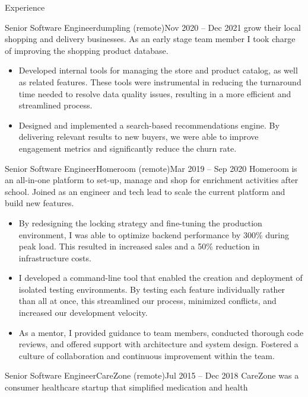 \documentclass[colibri]{mcdowellcv}
\begin{document}
\begin{cvsection}{Experience}
\begin{cvsubsection}{Senior Software Engineer}{dumpling (remote)}{Nov 2020 -- Dec 2021}
    grow their local shopping and delivery businesses. As an early stage team
    member I took charge of improving the shopping product database.
    \newline
		\begin{itemize}
    \item
      Developed internal tools for managing the store and product catalog, as
      well as related features. These tools were instrumental in reducing the
      turnaround time needed to resolve data quality issues, resulting in a more
      efficient and streamlined process.
    \item
      Designed and implemented a search-based recommendations engine. By
      delivering relevant results to new buyers, we were able to improve
      engagement metrics and significantly reduce the churn rate.
		\end{itemize}
	\end{cvsubsection}
	\begin{cvsubsection}{Senior Software Engineer}{Homeroom (remote)}{Mar 2019 -- Sep 2020}
    Homeroom is an all-in-one platform to set-up, manage and shop for enrichment
    activities after school. Joined as an engineer and tech lead to scale the
    current platform and build new features.
    \newline
		\begin{itemize}
    \item
      By redesigning the locking strategy and fine-tuning the production
      environment, I was able to optimize backend performance by 300\% during
      peak load. This resulted in increased sales and a 50\% reduction in
      infrastructure costs.
    \item I developed a command-line tool that enabled the creation and
      deployment of isolated testing environments. By testing each feature
      individually rather than all at once, this streamlined our process,
      minimized conflicts, and increased our development velocity.
    \item As a mentor, I provided guidance to team members, conducted thorough
      code reviews, and offered support with architecture and system
      design. Fostered a culture of collaboration and continuous improvement
      within the team.
		\end{itemize}
	\end{cvsubsection}
  \newpage
	\begin{cvsubsection}{Senior Software Engineer}{CareZone (remote)}{Jul 2015 -- Dec 2018}
    CareZone was a consumer healthcare startup that simplified medication and health

\end{cvsubsection}
\end{cvsection}
\end{document}
